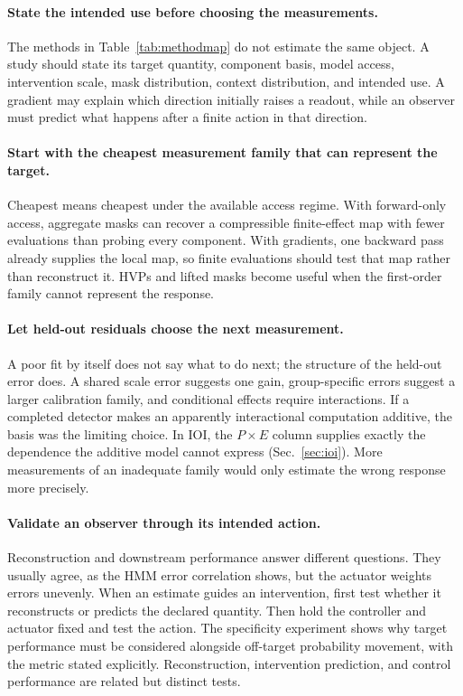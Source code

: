 \documentclass[sigconf,10pt,nonacm,balance=false]{acmart}
\begin{document}
\paragraph{State the intended use before choosing the measurements.}

The methods in Table~\ref{tab:methodmap} do not estimate the same object. A study should state its target quantity, component basis, model access, intervention scale, mask distribution, context distribution, and intended use. A gradient may explain which direction initially raises a readout, while an observer must predict what happens after a finite action in that direction.

\paragraph{Start with the cheapest measurement family that can represent the target.}

Cheapest means cheapest under the available access regime. With forward-only access, aggregate masks can recover a compressible finite-effect map with fewer evaluations than probing every component. With gradients, one backward pass already supplies the local map, so finite evaluations should test that map rather than reconstruct it. HVPs and lifted masks become useful when the first-order family cannot represent the response.

\paragraph{Let held-out residuals choose the next measurement.}

A poor fit by itself does not say what to do next; the structure of the held-out error does. A shared scale error suggests one gain, group-specific errors suggest a larger calibration family, and conditional effects require interactions. If a completed detector makes an apparently interactional computation additive, the basis was the limiting choice. In IOI, the $P\times E$ column supplies exactly the dependence the additive model cannot express (Sec.~\ref{sec:ioi}). More measurements of an inadequate family would only estimate the wrong response more precisely.

\paragraph{Validate an observer through its intended action.}

Reconstruction and downstream performance answer different questions. They usually agree, as the HMM error correlation shows, but the actuator weights errors unevenly. When an estimate guides an intervention, first test whether it reconstructs or predicts the declared quantity. Then hold the controller and actuator fixed and test the action. The specificity experiment shows why target performance must be considered alongside off-target probability movement, with the metric stated explicitly. Reconstruction, intervention prediction, and control performance are related but distinct tests.
\end{document}
